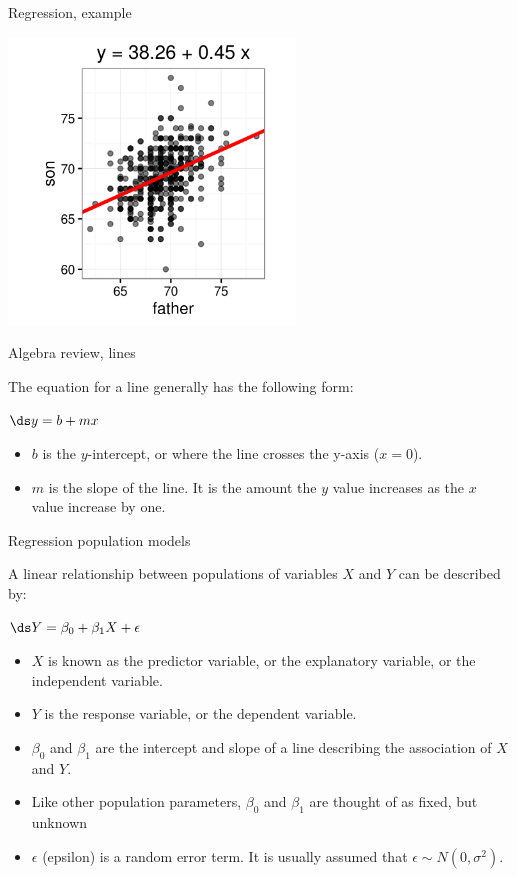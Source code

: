 \documentclass[xcolor=table, handout]{beamer}
\begin{document}
\begin{frame}{Regression, example}

\medskip
{\centering
\includegraphics[width=3in]{../images/ch10_reg_galton}
\par}

\end{frame}

\begin{frame}{Algebra review, lines}
\begin{block}{}
\large
The equation for a line generally has the following form:\\
\smallskip
{\centering \Large
$\ds y = b + mx$
\par}
\begin{itemize}
\item $b$ is the $y$-intercept, or where the line crosses the y-axis ($x=0$).
\item $m$ is the slope of the line. It is the amount the $y$ value increases as the $x$ value increase by one.
\end{itemize}
\end{block}
\end{frame}

\begin{frame}{Regression population models}
\begin{block}{}
\large
A linear relationship between populations of variables $X$ and $Y$ can be described by:\\
\smallskip
{\centering
$\ds Y = \beta_0 + \beta_1 X + \epsilon$
\par}
\smallskip
\begin{itemize}
\pause\item $X$ is known as the predictor variable, or the explanatory variable, or the independent variable.
\pause\item $Y$ is the response variable, or the dependent variable.
\pause\item $\beta_0$ and $\beta_1$ are the intercept and slope of a line describing the association of $X$ and $Y$.
\pause\item Like other population parameters, $\beta_0$ and $\beta_1$ are thought of as fixed, but unknown
\pause\item $\epsilon$ (epsilon) is a random error term. It is usually assumed that $\epsilon \sim N(0, \sigma^2)$.
\end{itemize}
\end{block}
\end{frame}
\end{document}
